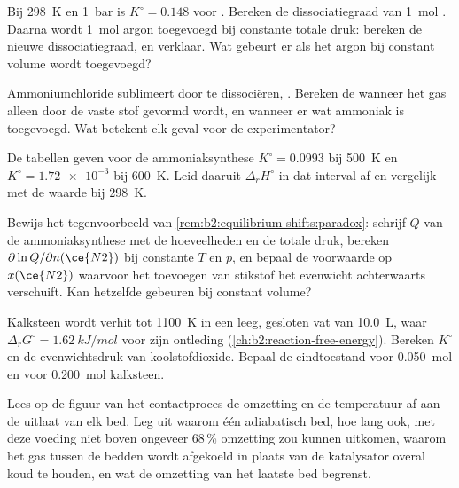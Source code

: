 \begin{exercise}[$\star\star$]\label{exo:b2:equilibrium-shifts:7}
Bij \qty{298}{K} en \qty{1}{bar} is $K^\circ = 0.148$ voor .
Bereken de dissociatiegraad van \qty{1}{mol} . Daarna wordt
\qty{1}{mol} argon toegevoegd bij constante totale druk: bereken de nieuwe
dissociatiegraad, en verklaar. Wat gebeurt er als het argon bij
constant volume wordt toegevoegd?
\end{exercise}

\begin{exercise}[$\star\star$]\label{exo:b2:equilibrium-shifts:8}
Ammoniumchloride sublimeert door te dissociëren, . Bereken de  wanneer het gas alleen door de vaste stof gevormd wordt, en wanneer
er wat ammoniak is toegevoegd. Wat betekent elk geval voor de experimentator?
\end{exercise}

\begin{exercise}[$\star\star$]\label{exo:b2:equilibrium-shifts:9}
De tabellen geven voor de ammoniaksynthese $K^\circ = 0.0993$ bij \qty{500}{K} en
$K^\circ = \num{1.72e-3}$ bij \qty{600}{K}. Leid daaruit $\Delta_r H^\circ$ in dat
interval af en vergelijk met de waarde bij \qty{298}{K}.
\end{exercise}

\begin{exercise}[$\star\star\star$]\label{exo:b2:equilibrium-shifts:10}
Bewijs het tegenvoorbeeld van \cref{rem:b2:equilibrium-shifts:paradox}: schrijf
$Q$ van de ammoniaksynthese met de hoeveelheden en de totale druk, bereken
$\partial\ln Q/\partial n(\ce{N2})$ bij constante $T$ en $p$, en bepaal de
voorwaarde op $x(\ce{N2})$ waarvoor het toevoegen van stikstof het evenwicht
achterwaarts verschuift. Kan hetzelfde gebeuren bij constant volume?
\end{exercise}

\begin{exercise}[$\star\star\star$]\label{exo:b2:equilibrium-shifts:11}
Kalksteen wordt verhit tot \qty{1100}{K} in een leeg, gesloten vat van
\qty{10.0}{L}, waar $\Delta_r G^\circ = \qty{1.62}{kJ/mol}$ voor zijn
ontleding (\cref{ch:b2:reaction-free-energy}). Bereken $K^\circ$ en de
evenwichtsdruk van koolstofdioxide. Bepaal de eindtoestand voor
\qty{0.050}{mol} en voor \qty{0.200}{mol} kalksteen.
\end{exercise}

\begin{exercise}[$\star\star\star$]\label{exo:b2:equilibrium-shifts:12}
Lees op de figuur van het contactproces de omzetting en de temperatuur af aan de
uitlaat van elk bed. Leg uit waarom één adiabatisch bed, hoe lang ook,
met deze voeding niet boven ongeveer 68\,\% omzetting zou kunnen uitkomen, waarom het gas
tussen de bedden wordt afgekoeld in plaats van de katalysator overal koud te houden, en wat
de omzetting van het laatste bed begrenst.
\end{exercise}

